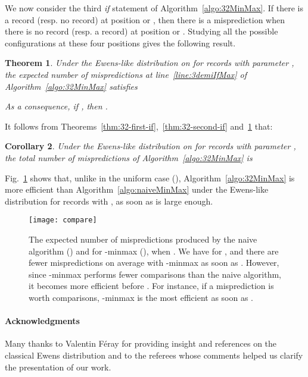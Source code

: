\documentclass[proceedings]{aofa}
\newtheorem{theorem}{Theorem}
\newtheorem{corollary}[theorem]{Corollary}
\begin{document}
We now consider the third \emph{if} statement of Algorithm~\ref{algo:32MinMax}. 
If there is a record (resp. no record) at position  or , then there is a misprediction when there is no record (resp. a record) at position  or . Studying all the possible configurations at these four positions gives the following result. 
\begin{theorem}\label{thm:32-third-if}
Under the Ewens-like distribution on  for records with parameter , 
the expected number of mispredictions at line~\ref{line:3demiIfMax} of Algorithm~\ref{algo:32MinMax} satisfies

As a consequence,
if , then .
\end{theorem}
It follows from Theorems~\ref{thm:32-first-if},~\ref{thm:32-second-if} and~\ref{thm:32-third-if} that:
\begin{corollary}
Under the Ewens-like distribution on  for records with parameter , 
the total number of mispredictions of Algorithm~\ref{algo:32MinMax} is 

\end{corollary}

Fig.~\ref{fig:compare} shows that, unlike in the uniform case (), Algorithm~\ref{algo:32MinMax} is more efficient than Algorithm~\ref{algo:naiveMinMax} 
under the Ewens-like distribution for records with , as soon as  is large enough.
\begin{figure}[ht]
\begin{minipage}{.35\textwidth}
\vspace*{0.5em}
\texttt{[image: compare]}
\end{minipage}
\begin{minipage}{.63\textwidth}
\caption{The expected number of mispredictions produced by the naive algorithm () and for -minmax (), when . We have
 for , 
and there are fewer mispredictions on average with -minmax as soon as .
However, since -minmax performs  fewer comparisons than the naive algorithm, it becomes more efficient before . 
For instance, if a misprediction is worth  comparisons, -minmax is the most efficient as soon as .\label{fig:compare}}
\end{minipage}
\end{figure}


\paragraph{Acknowledgments} Many thanks to Valentin Féray for providing insight and references on the classical Ewens distribution and to the referees whose comments helped us clarify the presentation of our work.


\begin{small}

\end{small}
\end{document}
